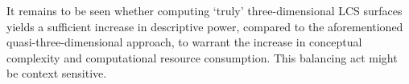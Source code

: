 It remains to be seen whether computing `truly' three-dimensional LCS surfaces
yields a sufficient increase in descriptive power, compared to the
aforementioned quasi-three-dimensional approach, to warrant the increase in
conceptual complexity and computational resource consumption. This balancing
act might be context sensitive.
\endgroup
